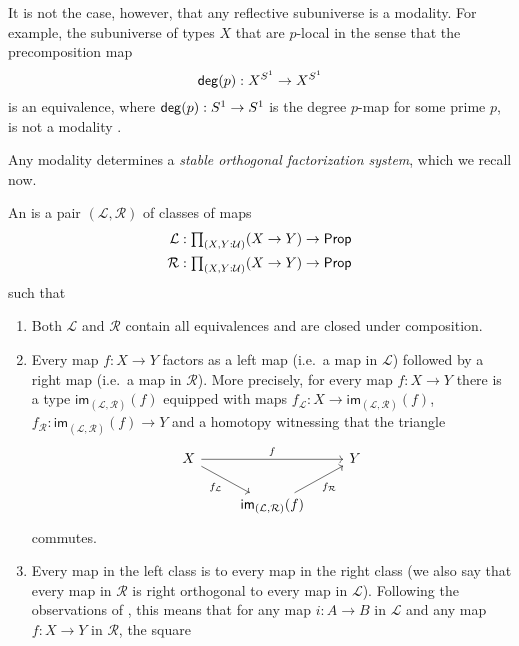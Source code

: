 \documentclass[9pt,twosided]{amsart}
\begin{document}
It is not the case, however, that any reflective subuniverse is a modality. For example, the subuniverse of types $X$ that are $p$-local in the sense that the precomposition map
\begin{equation*}
  \mathsf{deg}(p) : X^{S^{1}}\to X^{S^{1}}
\end{equation*}
is an equivalence, where $\mathsf{deg}(p):S^{1}\to S^{1}$ is the degree $p$-map for some prime $p$, is not a modality \cite{CORS}.

Any modality determines a \emph{stable orthogonal factorization system}, which we recall now.

\begin{defn}
  An  is a pair $(\mathcal{L},\mathcal{R})$ of classes of maps
  \begin{align*}
    \mathcal{L} & : \prd{X,Y:\UU} (X \to Y) \to \mathsf{Prop} \\
    \mathcal{R} & : \prd{X,Y:\UU} (X \to Y) \to \mathsf{Prop} 
  \end{align*}
  such that
  \begin{enumerate}
  \item Both $\mathcal{L}$ and $\mathcal{R}$ contain all equivalences and are closed under composition.
  \item Every map $f:X\to Y$ factors as a left map (i.e.~a map in $\mathcal{L}$) followed by a right map (i.e.~a map in $\mathcal{R}$). More precisely, for every map $f:X\to Y$ there is a type $\mathsf{im}_{(\mathcal{L},\mathcal{R})}(f)$ equipped with maps $f_{\mathcal{L}}:X\to \mathsf{im}_{(\mathcal{L},\mathcal{R})}(f)$, $f_{\mathcal{R}}:\mathsf{im}_{(\mathcal{L},\mathcal{R})}(f) \to Y$ and a homotopy witnessing that the triangle
    \begin{equation*}
      \begin{tikzcd}
        X \arrow[rr,"f"] \arrow[dr,swap,"f_{\mathcal{L}}"] & & Y \\
        & \mathsf{im}_{(\mathcal{L},\mathcal{R})}(f) \arrow[ur,swap,"f_{\mathcal{R}}"]
      \end{tikzcd}
    \end{equation*}
    commutes.
  \item Every map in the left class is  to every map in the right class (we also say that every map in $\mathcal{R}$ is right orthogonal to every map in $\mathcal{L}$). Following the observations of \cite{AnelBiedermanFinsterJoyal}, this means that for any map $i:A \to B$ in $\mathcal{L}$ and any map $f:X \to Y$ in $\mathcal{R}$, the square

\end{enumerate}
\end{defn}
\end{document}
